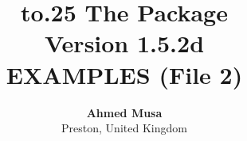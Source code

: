 \documentclass[final,showpagenos]{article}
\begin{document}
\title{%
  {\setbox\z@\vbox to.25\paperheight{}}%
  \bfseries The \texttt{} Package
  \\[1ex]
  \large Version 1.5.2d\\[2ex]
  \Large EXAMPLES (File 2)%
}
\author{%
  \textbf{Ahmed Musa}\\Preston, United Kingdom\\
}
\maketitle
\thispagestyle{empty}

\newpage

\ltslipsum[1-4]

\ltslipsum

\newpage

\ltslipsum[1-4]

\newpage

\ltslipsum[1-4]

\newpage

\ltslipsum[1-4]

\newpage

\ltslipsum[1-4]

\newpage

\ltslipsum[1-4]
\end{document}
